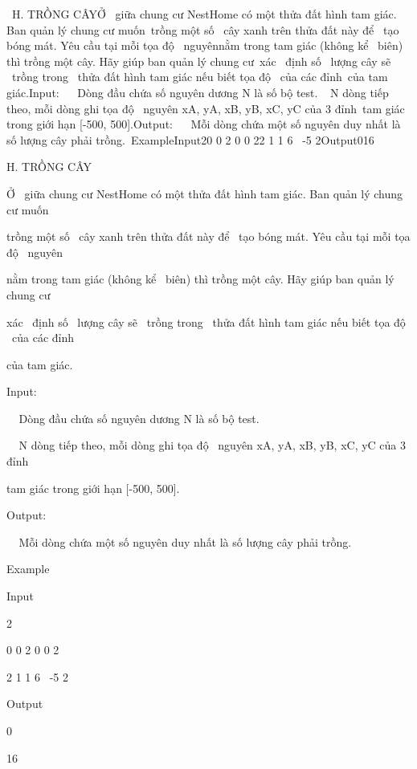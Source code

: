 

 H. TRỒNG CÂYỞ  giữa chung cư NestHome có một thửa đất hình tam giác. Ban quản lý chung cư muốn trồng một số  cây xanh trên thửa đất này để  tạo bóng mát. Yêu cầu tại mỗi tọa độ  nguyênnằm trong tam giác (không kể  biên) thì trồng một cây. Hãy giúp ban quản lý chung cư xác  định số  lượng cây sẽ  trồng trong  thửa đất hình tam giác nếu biết tọa độ  của các đỉnh của tam giác.Input:   Dòng đầu chứa số nguyên dương N là số bộ test.  N dòng tiếp theo, mỗi dòng ghi tọa độ  nguyên xA, yA, xB, yB, xC, yC của 3 đỉnh tam giác trong giới hạn [-500, 500].Output:   Mỗi dòng chứa một số nguyên duy nhất là số lượng cây phải trồng. ExampleInput20 0 2 0 0 22 1 1 6  -5 2Output016

H. TRỒNG CÂY

Ở  giữa chung cư NestHome có một thửa đất hình tam giác. Ban quản lý chung cư muốn 

trồng một số  cây xanh trên thửa đất này để  tạo bóng mát. Yêu cầu tại mỗi tọa độ  nguyên

nằm trong tam giác (không kể  biên) thì trồng một cây. Hãy giúp ban quản lý chung cư 

xác  định số  lượng cây sẽ  trồng trong  thửa đất hình tam giác nếu biết tọa độ  của các đỉnh 

của tam giác.

Input: 

  Dòng đầu chứa số nguyên dương N là số bộ test.

  N dòng tiếp theo, mỗi dòng ghi tọa độ  nguyên xA, yA, xB, yB, xC, yC của 3 đỉnh 

tam giác trong giới hạn [-500, 500].

Output: 

  Mỗi dòng chứa một số nguyên duy nhất là số lượng cây phải trồng. 

Example

Input

2

0 0 2 0 0 2

2 1 1 6  -5 2

Output

0

16

 